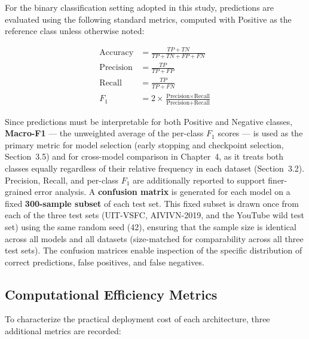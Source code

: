\documentclass[12pt]{report} %
\begin{document}
For the binary classification setting adopted in this study, predictions are evaluated using the following standard metrics, computed with Positive as the reference class unless otherwise noted:

\begin{align}
    \text{Accuracy}  & = \frac{TP + TN}{TP + TN + FP + FN}                                                       \\
    \text{Precision} & = \frac{TP}{TP + FP}                                                                      \\
    \text{Recall}    & = \frac{TP}{TP + FN}                                                                      \\
    F_1              & = 2 \times \frac{\text{Precision} \times \text{Recall}}{\text{Precision} + \text{Recall}}
\end{align}

Since predictions must be interpretable for both Positive and Negative classes, \textbf{Macro-F1} --- the unweighted average of the per-class $F_1$ scores --- is used as the primary metric for model selection (early stopping and checkpoint selection, Section~3.5) and for cross-model comparison in Chapter~4, as it treats both classes equally regardless of their relative frequency in each dataset (Section~3.2). Precision, Recall, and per-class $F_1$ are additionally reported to support finer-grained error analysis. A \textbf{confusion matrix} is generated for each model on a fixed \textbf{300-sample subset} of each test set. This fixed subset is drawn once from each of the three test sets (UIT-VSFC, AIVIVN-2019, and the YouTube wild test set) using the same random seed (42), ensuring that the sample size is identical across all models and all datasets (size-matched for comparability across all three test sets). The confusion matrices enable inspection of the specific distribution of correct predictions, false positives, and false negatives.

\subsection{Computational Efficiency Metrics}

To characterize the practical deployment cost of each architecture, three additional metrics are recorded:
\end{document}
